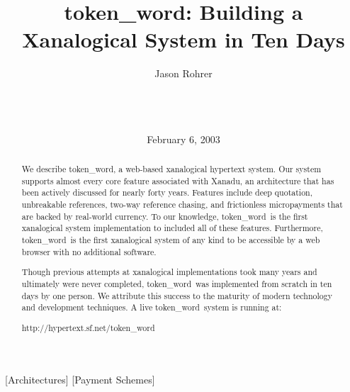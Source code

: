 \documentclass{acm_proc_article-sp}
\newcommand{\tw}{token\_word}
\begin{document}
\title{\tw:  Building a Xanalogical System in Ten Days}


\author{
\alignauthor Jason Rohrer\\
    \\
    \\
    \\
}

\date{February 6, 2003}


\maketitle

\begin{abstract}
We describe \tw, a web-based xanalogical hypertext system.  Our system supports almost every core feature associated with Xanadu, an architecture that has been actively discussed for nearly forty years.
Features include deep quotation, unbreakable references, two-way reference chasing, and frictionless micropayments that are backed by real-world currency.
To our knowledge, \tw \ is the first xanalogical system implementation to included all of these features.  Furthermore, \tw \  is the first xanalogical system of any kind to be accessible by a web browser with no additional software.

Though previous attempts at xanalogical implementations took many years and ultimately were never completed, \tw \  was implemented from scratch in ten days by one person.  
We attribute this success to the maturity of modern technology and development techniques.  
A live \tw \  system is running at:
\begin{center}
http://hypertext.sf.net/token\_word
\end{center}
\end{abstract}

[Architectures]
[Payment Schemes]



\end{document}
